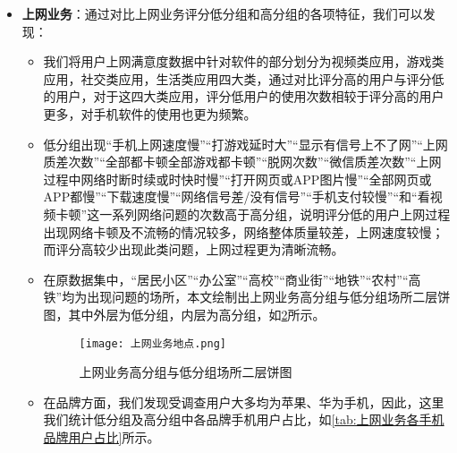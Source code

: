 \documentclass{MathorCupmodeling}
\begin{document}
\begin{itemize}
\begin{itemize}
\begin{figure}[H]
\begin{minipage}{0.48\linewidth}
					\caption{语音业务不稳定情况低分组散点分布图}
					\label{fig:语音业务脱网次数、mos质差次数、未接通掉话次数合计低分组}
				\end{minipage}
			\end{figure}
		\end{itemize}
		观察\textcolor{blue}{\cref{fig:语音业务脱网次数、mos质差次数、未接通掉话次数合计高分组}}及\textcolor{blue}{\cref{fig:语音业务脱网次数、mos质差次数、未接通掉话次数合计低分组}}，我们可以发现：高分组用户“语音业务脱网次数、mos质差次数、未接通掉话次数合计”次数在整体上明显少于低分组用户，且高分组用户在实际使用移动通信时，遇到的问题类型明显少于低分组用户，相反，低分组用户在整体上遇到的问题类型更多，对于单个用户，其在一定程度上，极有可能因遇到的问题类型较多，而给出较低评分。

		\item \textbf{上网业务}：通过对比上网业务评分低分组和高分组的各项特征，我们可以发现：
		\begin{itemize}
		\item 我们将用户上网满意度数据中针对软件的部分划分为视频类应用，游戏类应用，社交类应用，生活类应用四大类，通过对比评分高的用户与评分低的用户，对于这四大类应用，评分低用户的使用次数相较于评分高的用户更多，对手机软件的使用也更为频繁。
		\item 低分组出现“手机上网速度慢”“打游戏延时大”“显示有信号上不了网”“上网质差次数”“全部都卡顿全部游戏都卡顿”“脱网次数”“微信质差次数”“上网过程中网络时断时续或时快时慢”“打开网页或APP图片慢”“全部网页或APP都慢”“下载速度慢”“网络信号差/没有信号”“手机支付较慢”“和“看视频卡顿”这一系列网络问题的次数高于高分组，说明评分低的用户上网过程出现网络卡顿及不流畅的情况较多，网络整体质量较差，上网速度较慢；而评分高较少出现此类问题，上网过程更为清晰流畅。
		\item 在原数据集中，“居民小区”“办公室”“高校”“商业街”“地铁”“农村”“高铁”均为出现问题的场所，本文绘制出上网业务高分组与低分组场所二层饼图，其中外层为低分组，内层为高分组，如\textcolor{blue}{\cref{fig:上网业务高分组与低分组场所二层饼图}}所示。
		\begin{figure}[H]
			\centering
			\texttt{[image: 上网业务地点.png]}
			\caption{上网业务高分组与低分组场所二层饼图}
			\label{fig:上网业务高分组与低分组场所二层饼图}
		\end{figure}
		\item 在品牌方面，我们发现受调查用户大多均为苹果、华为手机，因此，这里我们统计低分组及高分组中各品牌手机用户占比，如\textcolor{blue}{\cref{tab:上网业务各手机品牌用户占比}}所示。
		\begin{table}[H]
			\centering

\end{table}
\end{itemize}
\end{itemize}
\end{document}
